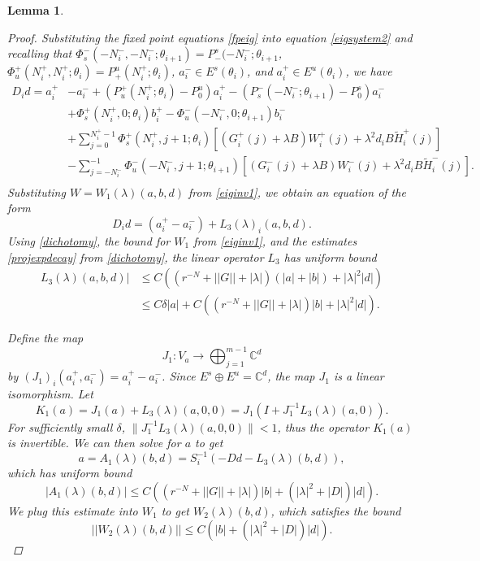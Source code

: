 \documentclass[12pt]{elsarticle}
\def\C{{\mathbb C}}
\newtheorem{lemma}{Lemma}
\begin{document}
\begin{lemma}
\begin{proof}
Substituting the fixed point equations \cref{fpeig} into equation \cref{eigsystem2} and recalling that $\Phi_s^-(-N_i^-, -N_i^-; \theta_{i+1}) = P_-^s(-N_i^-; \theta_{i+1}$, $\Phi_u^+(N_i^+, N_i^+; \theta_i) = P_+^u(N_i^+; \theta_{i})$, $a_i^- \in E^s(\theta_i)$, and $a_i^+ \in E^u(\theta_i)$, we have
\begin{align}
D_i d = a_i^+ &- a_i^- + (P_u^+(N_i^+; \theta_i) - P_0^u) a_i^+ - (P_s^-(-N_i^-; \theta_{i+1}) - P_0^s) a_i^- \\
&+ \Phi_s^+(N_i^+, 0; \theta_i) b_i^+ - \Phi_u^-(-N_i^-, 0; \theta_{i+1}) b_i^- \nonumber \\
&+ \sum_{j = 0}^{N_i^+-1} \Phi_s^+(N_i^+, j+1; \theta_i) 
[(G_i^+(j) + \lambda B) W_i^+(j) + \lambda^2 d_i B \tilde{H}_i^+(j)] \nonumber \\
&- \sum_{j = -N_i^-}^{-1} \Phi_u^-(-N_i^-, j+1; \theta_{i+1}) 
[(G_i^-(j) + \lambda B) W_i^-(j) + \lambda^2 d_i B \tilde{H}_i^-(j)] . \nonumber \\
\end{align}
Substituting $W = W_1(\lambda)(a, b, d)$ from \cref{eiginv1}, we obtain an equation of the form 
\begin{equation}\label{Dideq2}
D_i d = (a_i^+ - a_i^-) + L_3(\lambda)_i(a,b,d).
\end{equation}
Using \cref{dichotomy}, the bound for $W_1$ from \cref{eiginv1}, and the estimates \cref{projexpdecay} from \cref{dichotomy}, the linear operator $L_3$ has uniform bound
\begin{align}\label{L3bound}
L_3(\lambda)(a,b,d)| &\leq C\left( (r^{-N} + ||G|| + |\lambda| ) (|a| + |b|) + |\lambda|^2 |d|  \right) \\
&\leq C \delta |a| + C\left( (r^{-N} + ||G|| + |\lambda| ) |b| + |\lambda|^2 |d|  \right) . \nonumber
\end{align}

Define the map
\[
J_1: V_a \rightarrow \bigoplus_{j=1}^{m-1} \C^d
\]
by $(J_1)_i(a_i^+, a_i^-) = a_i^+ - a_i^-$. Since $E^s \oplus E^u = \C^d$, the map $J_1$ is a linear isomorphism. Let
\[
K_1(a) = J_1 (a) + L_3(\lambda)(a, 0, 0) = J_1( I + J_1^{-1} L_3(\lambda)(a, 0) ).
\]
For sufficiently small $\delta$, $\|J_1^{-1} L_3(\lambda)(a, 0, 0)\| < 1$, thus the operator $K_1(a)$ is invertible. We can then solve for $a$ to get
\[
a = A_1(\lambda)(b, d) = S_i^{-1}(-D d - L_3(\lambda)(b, d)),
\]
which has uniform bound
\begin{equation*}
|A_1(\lambda)(b, d)| \leq C \left( (r^{-N} + ||G|| + |\lambda| ) |b| + (|\lambda|^2 + |D| ) |d|  \right).
\end{equation*}
We plug this estimate into $W_1$ to get $W_2(\lambda)(b,d)$, which satisfies the bound
\begin{equation*}
||W_2(\lambda)(b,d)|| \leq C \left( |b| + (|\lambda|^2 + |D|) |d| \right).
\end{equation*}


\end{proof}
\end{lemma}
\end{document}
